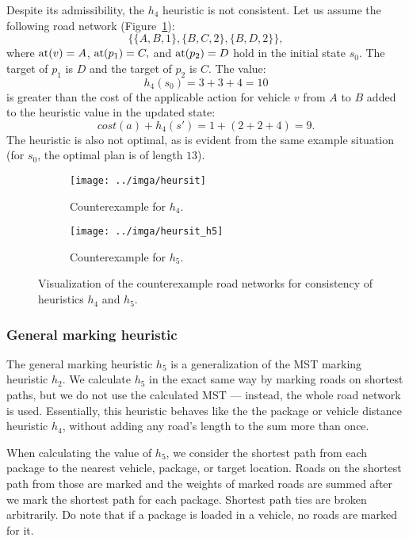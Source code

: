 Despite its admissibility, the $h_4$ heuristic is not consistent. Let us assume the following road network (Figure~\ref{fig:heursit}):
$$\{\{A, B, 1\}, \{B, C, 2\}, \{B, D, 2\}\},$$
where $\textrm{at}(v) = A$, $\textrm{at}(p_1) = C,$ and $\textrm{at}(p_2) = D$
hold in the initial state $s_0$.
The target of $p_1$ is $D$ and the target of $p_2$ is $C$.
The value:
$$h_4(s_0) = 3+3+4 = 10$$ is greater than the cost
of the applicable \drive{} action for vehicle $v$ from $A$ to $B$
added to the heuristic value in the updated state:
$$cost(a) + h_4(s') = 1 + (2+2+4) = 9.$$
The heuristic is also not optimal, as is evident from the same
example situation (for $s_0$, the optimal plan is of length $13$).

\begin{figure}[t]
\centering
\begin{subfigure}{0.48\textwidth}
\centering
\texttt{[image: ../imga/heursit]}
\caption{Counterexample for $h_4$.}
\label{fig:heursit}
\end{subfigure}
\begin{subfigure}{0.48\textwidth}
\centering
\texttt{[image: ../imga/heursit\_h5]}
\caption{Counterexample for $h_5$.}
\label{fig:heursit_h5}
\end{subfigure}
\caption{Visualization of the counterexample road networks
for consistency of heuristics $h_4$ and $h_5$.}
\label{fig:heursits}
\end{figure}

\subsubsection{General marking heuristic}\label{sfa5}

The general marking heuristic $h_5$ is a generalization of the MST marking heuristic $h_2$. We calculate $h_5$ in the exact same way by marking roads on shortest paths,
but we do not use the calculated MST --- instead, the whole road network is used. Essentially, this heuristic behaves like the the package or vehicle distance heuristic $h_4$, without adding any road's length to the sum more than once.

When calculating the value of $h_5$, we consider the shortest path from each package to the nearest
vehicle, package, or target location. Roads on the shortest path
from those are marked and the weights of marked roads are summed after
we mark the shortest path for each package.
Shortest path ties are broken arbitrarily.
Do note that if a package is loaded in a vehicle, no roads are marked for it.


